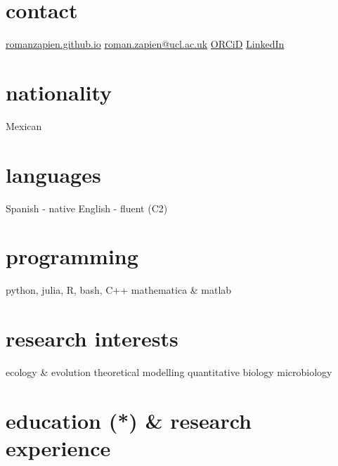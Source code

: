 \documentclass[]{friggeri-cv} %
\begin{document}


\begin{aside} %
\section{contact}
\href{https://romanzapien.github.io}{romanzapien.github.io}
\href{mailto:roman.zapien@ucl.ac.uk}{roman.zapien@ucl.ac.uk}
\href{https://orcid.org/0000-0003-0221-0936}{ORCiD}
\href{https://www.linkedin.com/in/romanzapien-campos/}{LinkedIn}
\section{nationality}
Mexican
\section{languages}
Spanish - native
English - fluent (C2)
\section{programming}
python, julia, R, bash, C++ 
mathematica \& matlab
\section{research interests}
ecology \& evolution
theoretical modelling
quantitative biology
microbiology
\end{aside}


\section{education (*) \& research experience}
\end{document}
